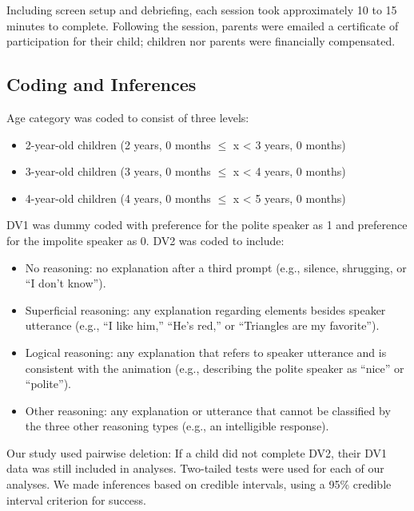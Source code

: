\documentclass[
  english,
  man,floatsintext]{apa6}
\begin{document}
Including screen setup and debriefing, each session took approximately 10 to 15 minutes to complete. Following the session, parents were emailed a certificate of participation for their child; children nor parents were financially compensated.

\hypertarget{coding-and-inferences}{%
\subsection{Coding and Inferences}\label{coding-and-inferences}}

Age category was coded to consist of three levels:

\begin{itemize}
\item
  2-year-old children (2 years, 0 months \(\leqslant\) x \textless{} 3 years, 0 months)
\item
  3-year-old children (3 years, 0 months \(\leqslant\) x \textless{} 4 years, 0 months)
\item
  4-year-old children (4 years, 0 months \(\leqslant\) x \textless{} 5 years, 0 months)
\end{itemize}

DV1 was dummy coded with preference for the polite speaker as 1 and preference for the impolite speaker as 0. DV2 was coded to include:

\begin{itemize}
\item
  No reasoning: no explanation after a third prompt (e.g., silence, shrugging, or ``I don't know'').
\item
  Superficial reasoning: any explanation regarding elements besides speaker utterance (e.g., ``I like him,'' ``He's red,'' or ``Triangles are my favorite'').
\item
  Logical reasoning: any explanation that refers to speaker utterance and is consistent with the animation (e.g., describing the polite speaker as ``nice'' or ``polite'').
\item
  Other reasoning: any explanation or utterance that cannot be classified by the three other reasoning types (e.g., an intelligible response).
\end{itemize}

Our study used pairwise deletion: If a child did not complete DV2, their DV1 data was still included in analyses. Two-tailed tests were used for each of our analyses. We made inferences based on credible intervals, using a 95\% credible interval criterion for success.
\end{document}
